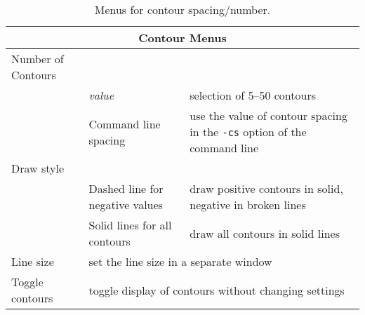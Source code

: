 \begin{table}[ht]
  \begin{center}
    \begin{tabular}{|l|l|p{2.5 in}|} \hline
      \multicolumn{3}{|c|}{Contour Menus} \\ \hline
    Number of Contours & & \\
    &  \emph{value} & selection of 5--50 contours \\
    &  Command line spacing & use the value of contour spacing in the
    \texttt{-cs} option of the command line\\ \hline
    Draw style & & \\
    & Dashed line for negative values & draw positive contours in solid,
    negative in broken lines\\
    & Solid lines for all contours & draw all contours in solid lines\\
    \hline
    Line size & \multicolumn{2}{|l|}{set the line size in a separate
    window} \\ \hline
    Toggle contours & \multicolumn{2}{|l|}{toggle display of contours
    without changing settings} \\ \hline
    \end{tabular}
  \end{center}
\caption{Menus for contour spacing/number.}
\label{table:contours}
\end{table}

